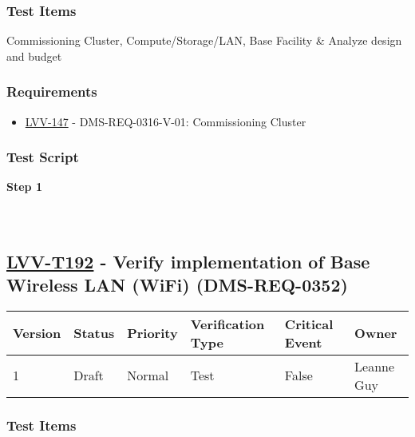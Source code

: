 \hypertarget{test-items-91}{%
\subsubsection{Test Items}\label{test-items-91}}

Commissioning Cluster, Compute/Storage/LAN, Base Facility \& Analyze
design and budget

\hypertarget{requirements-91}{%
\subsubsection{Requirements}\label{requirements-91}}

\begin{itemize}
\tightlist
\item
  \href{https://jira.lsstcorp.org/browse/LVV-147}{LVV-147} -
  DMS-REQ-0316-V-01: Commissioning Cluster
\end{itemize}

\hypertarget{test-script-91}{%
\subsubsection{Test Script}\label{test-script-91}}

\textbf{Step 1}\\
~\\
~\\

\hypertarget{lvv-t192---verify-implementation-of-base-wireless-lan-wifi-dms-req-0352}{%
\subsection{\texorpdfstring{\href{https://jira.lsstcorp.org/secure/Tests.jspa\#/testCase/LVV-T192}{LVV-T192}
- Verify implementation of Base Wireless LAN (WiFi)
(DMS-REQ-0352)}{LVV-T192 - Verify implementation of Base Wireless LAN (WiFi) (DMS-REQ-0352)}}\label{lvv-t192---verify-implementation-of-base-wireless-lan-wifi-dms-req-0352}}

\begin{longtable}[]{@{}llllll@{}}
\toprule
Version & Status & Priority & Verification Type & Critical Event &
Owner\tabularnewline
\midrule
\endhead
1 & Draft & Normal & Test & False & Leanne Guy\tabularnewline
\bottomrule
\end{longtable}

\hypertarget{test-items-92}{%
\subsubsection{Test Items}\label{test-items-92}}

